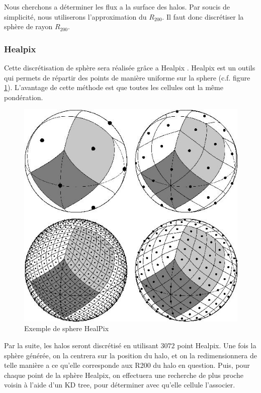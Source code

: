 Nous cherchons a déterminer les flux a la surface des halos.
Par soucis de simplicité, nous utiliserons l'approximation du $R_{200}$.
Il faut donc discrétiser la sphère de rayon $R_{200}$.


\subsubsection{Healpix}
\label{sec:healpix}

Cette discrétisation de sphère sera réalisée grâce a Healpix \citep{gorski_healpix:_2005}.
Healpix est un outils qui permets de répartir des points de manière uniforme sur la sphere (c.f. figure \ref{fig:HealPix}).
L'avantage de cette méthode est que toutes les cellules ont la même pondération.


\begin{figure}
        \includegraphics[width=.95\linewidth]{img/03/healpix.jpg} 
        \caption{Exemple de sphere HealPix}
 		\label{fig:HealPix}
\end{figure}

Par la suite, les halos seront discrétisé en utilisant $3072$ point Healpix.
Une fois la sphère générée, on la centrera sur la position du halo, et on la redimensionnera de telle manière a ce qu'elle corresponde aux R200 du halo en question.
Puis, pour chaque point de la sphère Healpix, on effectuera une recherche de plus proche voisin à l'aide d'un KD tree, pour déterminer avec qu'elle cellule l'associer.


